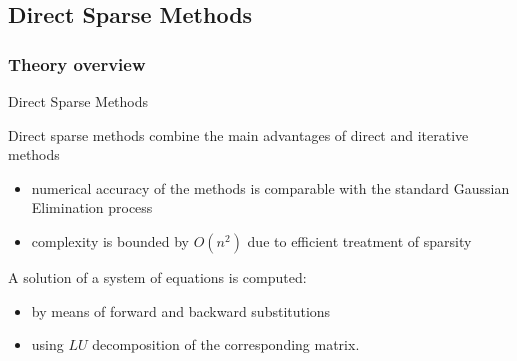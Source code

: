 \subsection{Direct Sparse Methods}
\subsubsection{Theory overview}

\begin{frame}[t]{Direct Sparse Methods}
    \small
    \justifying
    
    Direct sparse methods combine the main advantages of direct and iterative methods
    
    \begin{itemize}
    	\item numerical accuracy of the methods is comparable with the standard Gaussian Elimination process
    	
    	\item complexity is bounded by $O(n^{2})$ due to efficient treatment of sparsity
    \end{itemize}

	\vspace{5mm}
	A solution of a system of equations is computed:
	\begin{itemize}
		\item by means of forward and backward substitutions
		 
		\item using $LU$ decomposition of the corresponding matrix.
	\end{itemize}
\end{frame}


